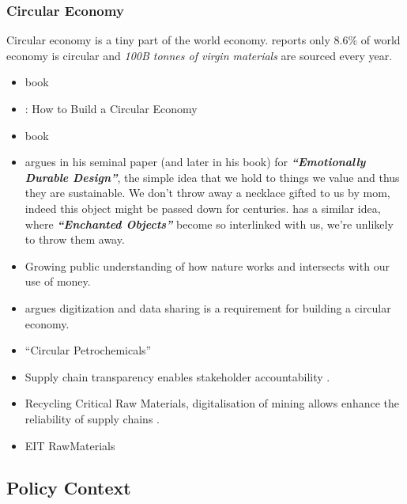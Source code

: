 \documentclass[
  letterpaper,
  DIV=11,
  numbers=noendperiod]{scrartcl}
\begin{document}
\subsubsection{Circular Economy}\label{circular-economy}

Circular economy is a tiny part of the world economy.
\citet{circleeconomyCircularityGapReport2022} reports only 8.6\% of
world economy is circular and \emph{100B tonnes of virgin materials} are
sourced every year.

\begin{itemize}
\item
  \citet{mcdonoughCradleCradleRemaking2002} book
\item
  \citet{mcgintyHowBuildCircular2020}: How to Build a Circular Economy
\item
  \citet{dullCircularSupplyChain2021} book
\item
  \citet{chapmanDesignEmotionalDurability2009} argues in his seminal
  paper (and later in his book) for \textbf{\emph{``Emotionally Durable
  Design''}}, the simple idea that we hold to things we value and thus
  they are sustainable. We don't throw away a necklace gifted to us by
  mom, indeed this object might be passed down for centuries.
  \citet{roseEnchantedObjectsInnovation2015} has a similar idea, where
  \textbf{\emph{``Enchanted Objects''}} become so interlinked with us,
  we're unlikely to throw them away.
\item
  Growing public understanding of how nature works and intersects with
  our use of money.
\item
  \citet{hedbergCircularEconomyRole2021} argues digitization and data
  sharing is a requirement for building a circular economy.
\item
  ``Circular Petrochemicals''
  \citet{langeCircularCarbochemicalsMetamorphosis2021}
\item
  Supply chain transparency enables stakeholder accountability
  \citep{circulariseFlexibleTransparencyPart2018, dooreyTransparentSupplyChain2011, foxUncertainRelationshipTransparency2007}.
\item
  Recycling Critical Raw Materials, digitalisation of mining allows
  enhance the reliability of supply chains
  \citep{crmallianceEITRawMaterials2020}.
\item
  EIT RawMaterials
\end{itemize}

\subsection{Policy Context}\label{policy-context}
\end{document}
